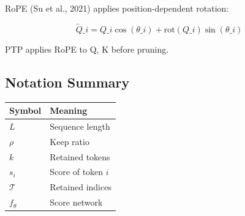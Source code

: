 RoPE (Su et al., 2021) applies position-dependent rotation:

\[
\tilde{Q}\_i = Q\_i \cos(\theta\_i) + \text{rot}(Q\_i) \sin(\theta\_i)
\tag{3.8}
\]

PTP applies RoPE to Q, K before pruning.

\subsection{Notation Summary}

\begin{table}[H]
\centering
\small
\begin{tabular}{ll}
\toprule
\textbf{Symbol} & \textbf{Meaning} \\
\midrule
$L$ & Sequence length \\
$\rho$ & Keep ratio \\
$k$ & Retained tokens \\
$s_i$ & Score of token $i$ \\
$\mathcal{T}$ & Retained indices \\
$f_\theta$ & Score network \\
\bottomrule
\end{tabular}
\end{table}

